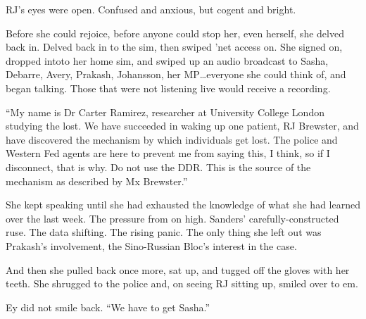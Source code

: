 RJ's eyes were open. Confused and anxious, but cogent and bright.

Before she could rejoice, before anyone could stop her, even herself, she delved back in. Delved back in to the sim, then swiped 'net access on. She signed on, dropped intoto her home sim, and swiped up an audio broadcast to Sasha, Debarre, Avery, Prakash, Johansson, her MP\ldots{}everyone she could think of, and began talking. Those that were not listening live would receive a recording.

``My name is Dr Carter Ramirez, researcher at University College London studying the lost. We have succeeded in waking up one patient, RJ Brewster, and have discovered the mechanism by which individuals get lost. The police and Western Fed agents are here to prevent me from saying this, I think, so if I disconnect, that is why. Do not use the DDR. This is the source of the mechanism as described by Mx Brewster.''

She kept speaking until she had exhausted the knowledge of what she had learned over the last week. The pressure from on high. Sanders' carefully-constructed ruse. The data shifting. The rising panic. The only thing she left out was Prakash's involvement, the Sino-Russian Bloc's interest in the case.

And then she pulled back once more, sat up, and tugged off the gloves with her teeth. She shrugged to the police and, on seeing RJ sitting up, smiled over to em.

Ey did not smile back. ``We have to get Sasha.''
